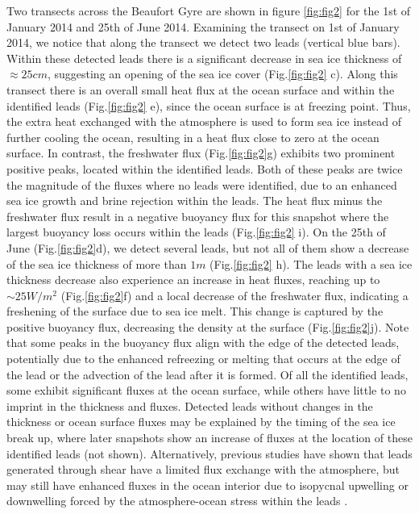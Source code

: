 \documentclass[lineno,sn-basic]{sn-jnl}%
\begin{document}
Two transects across the Beaufort Gyre are shown in figure \ref{fig:fig2} for the 1st of January 2014 and 25th of June 2014.
Examining the transect on 1st of January 2014, we notice that along the transect we detect two leads (vertical blue bars). Within these detected leads there is a significant decrease in sea ice thickness of $\approx 25cm$, suggesting an opening of the sea ice cover (Fig.\ref{fig:fig2} c).
Along this transect there is an overall small heat flux at the ocean surface and within the identified leads (Fig.\ref{fig:fig2} e), since the ocean surface is at freezing point. Thus, the extra heat exchanged with the atmosphere is used to form sea ice instead of further cooling the ocean, resulting in a heat flux close to zero at the ocean surface.
In contrast, the freshwater flux (Fig.\ref{fig:fig2}g) exhibits two prominent positive peaks, located within the identified leads. Both of these peaks are twice the magnitude of the fluxes where no leads were identified, due to an enhanced sea ice growth and brine rejection within the leads. 
The heat flux minus the freshwater flux result in a negative buoyancy flux for this snapshot where the largest buoyancy loss occurs within the leads (Fig.\ref{fig:fig2} i).
On the 25th of June (Fig.\ref{fig:fig2}d), we detect several leads, but not all of them show a decrease of the sea ice thickness of more than $1m$ (Fig.\ref{fig:fig2} h). The leads with a sea ice thickness decrease also experience an increase in heat fluxes, reaching up to $\sim 25 W/m^2$ (Fig.\ref{fig:fig2}f) and a local decrease of the freshwater flux, indicating a freshening of the surface due to sea ice melt. This change is captured by the positive buoyancy flux, decreasing the density at the surface (Fig.\ref{fig:fig2}j). Note that some peaks in the buoyancy flux align with the edge of the detected leads, potentially due to the enhanced refreezing or melting that occurs at the edge of the lead or the advection of the lead after it is formed. 
Of all the identified leads, some exhibit significant fluxes at the ocean surface, while others have little to no imprint in the thickness and fluxes. Detected leads  without changes in the thickness or ocean surface fluxes may be explained by the timing of the sea ice break up, where later snapshots show an increase of fluxes at the location of these identified leads (not shown). Alternatively, previous studies have shown that leads generated through shear have a limited flux exchange with the atmosphere, but may still have enhanced fluxes in the ocean interior due to isopycnal upwelling or downwelling forced by the atmosphere-ocean stress within the leads \citep{Bourgault_flux_lkf_2020}.
\end{document}
